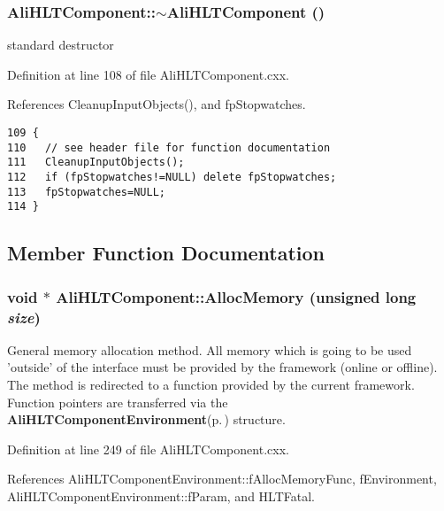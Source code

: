 \subsubsection{\setlength{\rightskip}{0pt plus 5cm}Ali\-HLTComponent::$\sim${\bf Ali\-HLTComponent} ()\hspace{0.3cm}{\tt  [virtual]}}\label{classAliHLTComponent_a3}


standard destructor 

Definition at line 108 of file Ali\-HLTComponent.cxx.

References Cleanup\-Input\-Objects(), and fp\-Stopwatches.

\footnotesize\begin{verbatim}109 {
110   // see header file for function documentation
111   CleanupInputObjects();
112   if (fpStopwatches!=NULL) delete fpStopwatches;
113   fpStopwatches=NULL;
114 }
\end{verbatim}\normalsize 




\subsection{Member Function Documentation}
\subsubsection{\setlength{\rightskip}{0pt plus 5cm}void $\ast$ Ali\-HLTComponent::Alloc\-Memory (unsigned long {\em size})\hspace{0.3cm}{\tt  [protected]}}\label{classAliHLTComponent_b7}


General memory allocation method. All memory which is going to be used 'outside' of the interface must be provided by the framework (online or offline). The method is redirected to a function provided by the current framework. Function pointers are transferred via the {\bf Ali\-HLTComponent\-Environment}{\rm (p.\,\pageref{structAliHLTComponentEnvironment})} structure. 

Definition at line 249 of file Ali\-HLTComponent.cxx.

References Ali\-HLTComponent\-Environment::f\-Alloc\-Memory\-Func, f\-Environment, Ali\-HLTComponent\-Environment::f\-Param, and HLTFatal.

